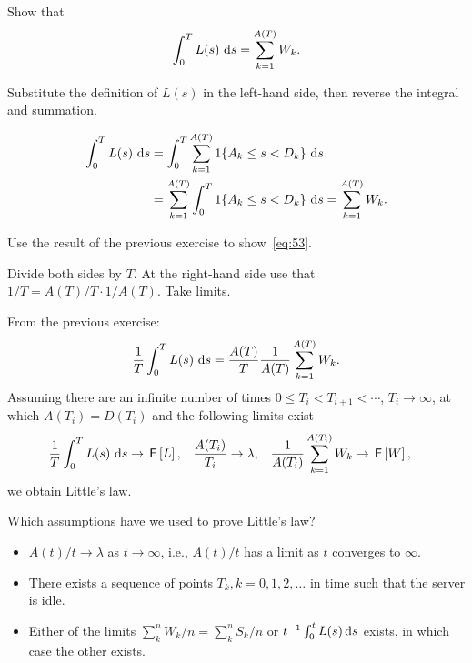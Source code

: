 \begin{exercise}
  Show that 
\begin{equation*}
  \int_0^T L(s)\, \,\text{d}s  =  \sum_{k=1}^{A(T)} W_k.
\end{equation*}
\begin{hint}
  Substitute the definition of $L(s)$ in the left-hand side, then reverse the integral and summation.
\end{hint}
\begin{solution}
\begin{equation*}
  \begin{split}
  \int_0^T L(s)\, \,\text{d}s & = \int_0^T \sum_{k=1}^{A(T)} 1\{A_k \leq s < D_k\} \, \,\text{d}s \\
& =  \sum_{k=1}^{A(T)}\int_0^T  1\{A_k \leq s < D_k\} \, \,\text{d}s =  \sum_{k=1}^{A(T)} W_k.
  \end{split}
\end{equation*}
\end{solution}
\end{exercise}


\begin{exercise}
  Use the result of the previous exercise to show~\eqref{eq:53}. 
\begin{hint}
  Divide both sides by $T$. At the right-hand side use that $1/T =  A(T)/T \cdot 1/A(T)$. Take limits.
\end{hint}
\begin{solution}
From the previous exercise:
\begin{equation*}
  \frac 1 T  \int_0^T L(s)\, \,\text{d}s  = \frac{A(T)} T \frac{1}{A(T)} \sum_{k=1}^{A(T)} W_k.
\end{equation*}
Assuming there are an infinite number of times
$0\leq T_i<T_{i+1}<\cdots$, $T_i\to\infty$, at which $A(T_i) = D(T_i)$
and the following limits exist
\begin{align*}
\frac 1 T  \int_0^T L(s)\, \,\text{d}s &\to \,\mathsf{E}\left[L\right],&
\frac{A(T_i)}{T_i} &\to \lambda, &
\frac{1}{A(T_i)} \sum_{k=1}^{A(T_i)} W_k &\to \,\mathsf{E}\left[W\right],
\end{align*}
we obtain  Little's law.
\end{solution}
\end{exercise}



\begin{exercise}
 Which assumptions have we used to prove Little's law?
  \begin{solution}
    \begin{itemize}
    \item 
 $A(t)/t \to \lambda$ as $t\to \infty$, i.e., $A(t)/t$ has a limit as $t$ converges to $\infty$. 
  \item There exists a sequence of points $T_k, k=0,1,2,\ldots$ in time such that the server is idle. 
  \item Either of the limits $\sum_k^n W_k/n = \sum_k^n S_k /n $ or
    $t^{-1}\int_0^t L(s) \,\text{d}s$ exists, in which case the other exists.
    \end{itemize}
  \end{solution}
\end{exercise}

